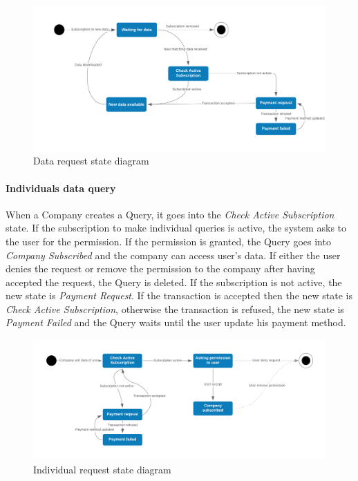 \begin{figure}[H]
	\includegraphics[width=\textwidth,height=\textheight,keepaspectratio]{assets/Data_request.pdf}
	\caption{Data request state diagram}
	\label{fig:DataRequest}
\end{figure}




\paragraph{Individuals data query}
When a Company creates a Query, it goes into the \textit{Check Active Subscription} state. If the subscription to make individual queries is active, the system asks to the user for the permission. If the permission is granted, the Query goes into \textit{Company Subscribed} and the company can access user's data. If either the user denies the request or remove the permission to the company after having accepted the request, the Query is deleted.
If the subscription is not active, the new state is \textit{Payment Request}. If the transaction is accepted then the new state is \textit{Check Active Subscription}, otherwise the transaction is refused, the new state is \textit{Payment Failed} and the Query waits until the user update his payment method.

\begin{figure}[H]
	\includegraphics[width=\textwidth,height=\textheight,keepaspectratio]{assets/IndividualRequest.pdf}
	\caption{Individual request state diagram}
	\label{fig:IndividualRequest}
\end{figure}


